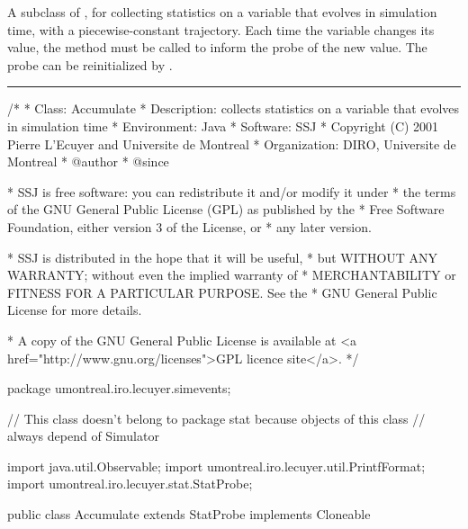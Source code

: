 
A subclass of ,
for collecting statistics on a
variable that evolves in simulation time, with a piecewise-constant trajectory.
Each time the variable changes its value, the method 
must be called to inform the probe of the new value.
The probe can be reinitialized by .

\bigskip\hrule

\begin{code}\begin{hide}
/*
 * Class:        Accumulate
 * Description:  collects statistics on a variable that evolves in
                 simulation time
 * Environment:  Java
 * Software:     SSJ
 * Copyright (C) 2001  Pierre L'Ecuyer and Universite de Montreal
 * Organization: DIRO, Universite de Montreal
 * @author
 * @since

 * SSJ is free software: you can redistribute it and/or modify it under
 * the terms of the GNU General Public License (GPL) as published by the
 * Free Software Foundation, either version 3 of the License, or
 * any later version.

 * SSJ is distributed in the hope that it will be useful,
 * but WITHOUT ANY WARRANTY; without even the implied warranty of
 * MERCHANTABILITY or FITNESS FOR A PARTICULAR PURPOSE.  See the
 * GNU General Public License for more details.

 * A copy of the GNU General Public License is available at
   <a href="http://www.gnu.org/licenses">GPL licence site</a>.
 */
\end{hide}
package umontreal.iro.lecuyer.simevents;\begin{hide}
// This class doesn't belong to package stat because objects of this class
// always depend of Simulator

import java.util.Observable;
import umontreal.iro.lecuyer.util.PrintfFormat;
import umontreal.iro.lecuyer.stat.StatProbe;
\end{hide}

public class Accumulate extends StatProbe implements Cloneable \begin{hide} {

   private double initTime;    // Initialization time.
   private double lastTime;    // Last update time.
   private double lastValue;   // Value since last update.
   private Simulator sim;
\end{hide}
\end{code}

